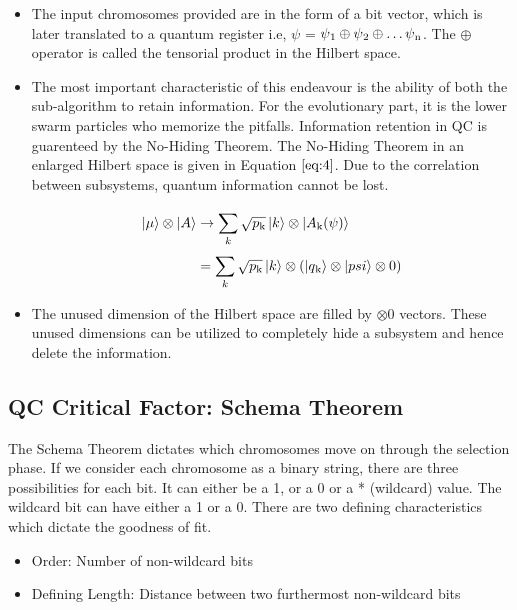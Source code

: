 \documentclass[conference]{IEEEtran}
\begin{document}
\begin{itemize}
\item The input chromosomes provided are in the form of a bit vector, which is later translated to a quantum register i.e, $\psi$ = $\psi\textsubscript{1} \oplus \psi\textsubscript{2} \oplus \dots \psi\textsubscript{n}$. The $\oplus$ operator is called the tensorial product in the Hilbert space.

\item The most important characteristic of this endeavour is the ability of both the sub-algorithm to retain information. For the evolutionary part, it is the lower swarm particles who memorize the pitfalls. Information retention in QC is guarenteed by the No-Hiding Theorem. The No-Hiding Theorem in an enlarged Hilbert space is given in Equation $\ref{eq:4}$. Due to the correlation between subsystems, quantum information cannot be lost. 

\begin{equation}
\label{eq:4}
\begin{split}
\ket{\mu} \otimes \ket{A} & \rightarrow \sum_{k}^{}\sqrt{p\textsubscript{k}}\ket{k} \otimes \ket{A\textsubscript{k}(\psi)}\\
& = \sum_{k}^{}\sqrt{p\textsubscript{k}}\ket{k} \otimes (\ket{q\textsubscript{k}} \otimes \ket{psi} \otimes 0)
\end{split}
\end{equation}

\item The unused dimension of the Hilbert space are filled by $\otimes 0$ vectors. These unused dimensions can be utilized to completely hide a subsystem and hence delete the information.
\end{itemize}

\subsection{QC Critical Factor: Schema Theorem}
The Schema Theorem \cite{st} dictates which chromosomes move on through the selection phase. If we consider each chromosome as a binary string, there are three possibilities for each bit. It can either be a 1, or a 0 or a * (wildcard) value. The wildcard bit can have either a 1 or a 0. There are two defining characteristics which dictate the goodness of fit. 

\begin{itemize}
\item Order: Number of non-wildcard bits 
\item Defining Length: Distance between two furthermost non-wildcard bits
\end{itemize}
\end{document}
